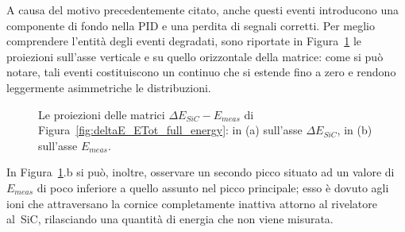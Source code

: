 A causa del motivo precedentemente citato, anche questi eventi introducono una componente di fondo nella PID e una perdita di segnali corretti.
Per meglio comprendere l'entità degli eventi degradati, sono riportate in Figura~\ref{fig:fetta} le proiezioni sull'asse verticale e su quello orizzontale della matrice: come si può notare, tali eventi costituiscono un continuo che si estende fino a zero e rendono leggermente asimmetriche le distribuzioni.
\begin{figure} [!p]
	\centering
	
	\caption{Le proiezioni delle matrici $\Delta E_{SiC} - E_{meas}$ di Figura~\ref{fig:deltaE_ETot_full_energy}: in (a) sull'asse $\Delta E_{SiC}$, in (b) sull'asse $E_{meas}$.} \label{fig:fetta}
\end{figure} 
In Figura~\ref{fig:fetta}.b si può, inoltre, osservare un secondo picco situato ad un valore di $E_{meas}$ di poco inferiore a quello assunto nel picco principale; esso è dovuto agli ioni che attraversano la cornice completamente inattiva attorno al rivelatore al~SiC, rilasciando una quantità di energia che non viene misurata.







